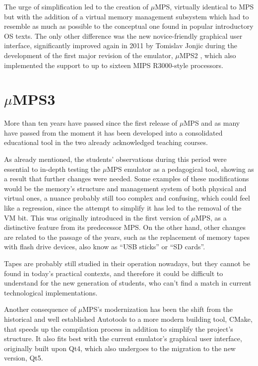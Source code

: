 \documentclass[12pt,a4paper,openright,twoside]{report}
\begin{document}
The urge of simplification led to the creation of $\mu$MPS, virtually identical to MPS but with the addition of a virtual memory management subsystem which had to resemble as much as possible to the conceptual one found in popular introductory OS texts.
The only other difference was the new novice-friendly graphical user interface, significantly improved again in 2011 by Tomislav Jonjic during the development of the first major revision of the emulator, $\mu$MPS2 \cite{umps2}, which also implemented the support to up to sixteen MIPS R3000-style processors.

\section{$\mu$MPS3}
More than ten years have passed since the first release of $\mu$MPS and as many have passed from the moment it has been developed into a consolidated educational tool in the two already acknowledged teaching courses.

As already mentioned, the students' observations during this period were essential to in-depth testing the $\mu$MPS emulator as a pedagogical tool, showing as a result that further changes were needed.
Some examples of these modifications would be the memory's structure and management system of both physical and virtual ones, a nuance probably still too complex and confusing, which could feel like a regression, since the attempt to simplify it has led to the removal of the VM bit.
This was originally introduced in the first version of $\mu$MPS, as a distinctive feature from its predecessor MPS.
On the other hand, other changes are related to the passage of the years, such as the replacement of memory tapes with flash drive devices, also know as ``USB sticks'' or ``SD cards''.

Tapes are probably still studied in their operation nowadays, but they cannot be found in today's practical contexts, and therefore it could be difficult to understand for the new generation of students, who can't find a match in current technological implementations.

Another consequence of $\mu$MPS's modernization has been the shift from the historical and well established Autotools to a more modern building tool, CMake, that speeds up the compilation process in addition to simplify the project's structure.
It also fits best with the current emulator's graphical user interface, originally built upon Qt4, which also undergoes to the migration to the new version, Qt5.
\end{document}
